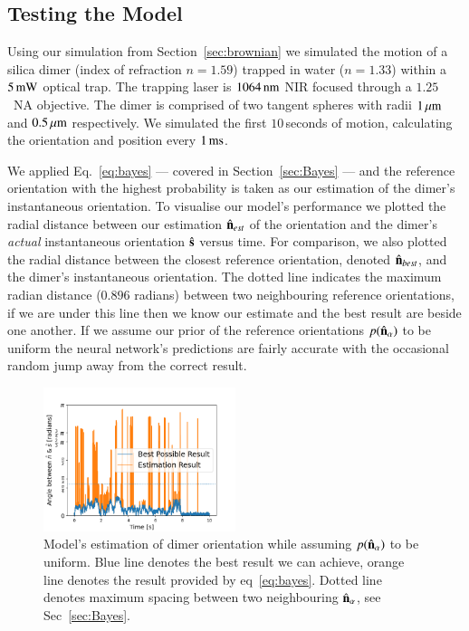 \documentclass[final,  3p]{elsarticle}
\begin{document}
\subsection{Testing the Model}
\label{sec:test}

Using our simulation from Section~\ref{sec:brownian} we simulated the
motion of a silica dimer (index of refraction $n=1.59$) trapped in
water ($n = 1.33$) within a $5\,{\rm mW}$ optical trap.  The trapping
laser is $1064\,{\rm nm}$ NIR focused through a $1.25$~NA objective.
The dimer is comprised of two tangent spheres with radii
$1\,\mu{\rm m}$ and $0.5\,\mu{\rm m}$ respectively. We simulated the
first $10$\,seconds of motion, calculating the orientation and
position every $1\,{\rm ms}$.

We applied Eq.~\eqref{eq:bayes} --- covered in Section~\ref{sec:Bayes} --- and the reference orientation with the highest probability is taken as our estimation of the dimer's instantaneous orientation. To visualise our model's performance  we plotted the radial distance between our estimation $\hat{\bf n}_{est}$ of the orientation and the dimer's \emph{actual} instantaneous orientation $\hat{\bf s}$ versus time. For comparison, we also plotted the radial distance between the closest reference orientation, denoted $\hat{\bf n}_{best}$, and the dimer's instantaneous orientation. The dotted line indicates the maximum radian distance ($0.896$ radians) between two neighbouring reference orientations, if we are under this line then we know our estimate and the best result are beside one another. If we assume our prior of the reference orientations $p(\hat{\bf n}_\alpha)$ to be uniform the neural network's predictions are fairly accurate with the occasional random jump away from the correct result. 

\begin{figure}[h]
	\centering
	\includegraphics[width=0.5\textwidth]{./Images/fig3.png}
	\caption{Model's estimation of dimer orientation while assuming $p(\hat{\bf n}_\alpha)$ to be uniform. Blue line denotes the best result we can achieve, orange line denotes the result provided by eq~\ref{eq:bayes}. Dotted line denotes maximum spacing between two neighbouring $\hat{\bf n}_\alpha$, see Sec~\ref{sec:Bayes}.}
	\label{fig:uniform}
\end{figure} 
\end{document}
